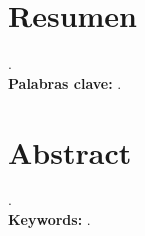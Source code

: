 \thispagestyle{resumenheader}

\chapter*{Resumen}

.\\

\hspace{-0.6cm}\textbf{Palabras clave: }.

\clearpage

\chapter*{Abstract}

.\\

\hspace{-0.6cm}\textbf{Keywords: }.
